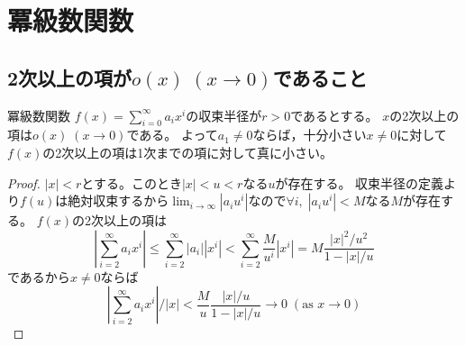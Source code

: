 \chapter{冪級数関数}
    \section{2次以上の項が\texorpdfstring{$o(x)\;(x\to 0)$}{o(x) (x→0)}であること}
        \begin{shadebox}
            冪級数関数
            $f(x) = \sum_{i=0}^\infty a_i x^i$の収束半径が$r>0$であるとする。
            $x$の2次以上の項は$o(x)\;(x\to 0)$である。
            よって$a_1\neq 0$ならば，十分小さい$x \neq 0$に対して$f(x)$の2次以上の項は1次までの項に対して真に小さい。
        \end{shadebox}
        \begin{proof}
            \quad\par
            $|x|<r$とする。このとき$|x|<u<r$なる$u$が存在する。
            収束半径の定義より$f(u)$は絶対収束するから$\lim_{i\to\infty} |a_i u^i|$なので$\forall i,\; |a_i u^i| < M$なる$M$が存在する。
            $f(x)$の2次以上の項は
            \[ \left|\sum_{i=2}^\infty a_i x^i\right| \leq \sum_{i=2}^\infty |a_i| |x^i| < \sum_{i=2}^\infty \frac{M}{u^i} |x^i| = M\frac{|x|^2/u^2}{1-|x|/u} \]
            であるから$x\neq 0$ならば
            \[ \left|\sum_{i=2}^\infty a_i x^i\right|/|x| < \frac{M}{u}\frac{|x|/u}{1-|x|/u} \to 0\; (\text{as } x\to 0) \]
        \end{proof}